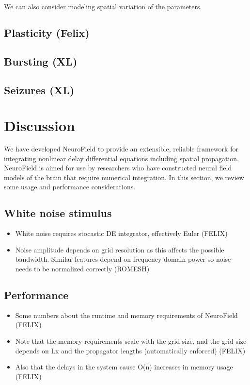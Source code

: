 \documentclass[preprint,review,10pt,authoryear,letterpaper]{elsarticle}
\begin{document}
We can also consider modeling spatial variation of the parameters. 


\subsection{Plasticity (Felix)}

\subsection{Bursting (XL)}

\subsection{Seizures (XL)}

\section{Discussion}
\label{sec:discussion}

We have developed NeuroField to provide an extensible, reliable framework for integrating nonlinear delay differential equations including spatial propagation. NeuroField is aimed for use by researchers who have constructed neural field models of the brain that require numerical integration. In this section, we review some usage and performance considerations.

\subsection{White noise stimulus}
\begin{itemize}
	\item White noise requires stocastic DE integrator, effectively Euler (FELIX)
	\item Noise amplitude depends on grid resolution as this affects the possible bandwidth. Similar features depend on frequency domain power so noise needs to be normalized correctly (ROMESH)
\end{itemize}

\subsection{Performance}

\begin{itemize}
\item Some numbers about the runtime and memory requirements of NeuroField (FELIX)
\item Note that the memory requirements scale with the grid size, and the grid size depends on Lx and the propagator lengths (automatically enforced) (FELIX)
\item Also that the delays in the system cause O(n) increases in memory usage (FELIX)
\end{itemize}
\end{document}
